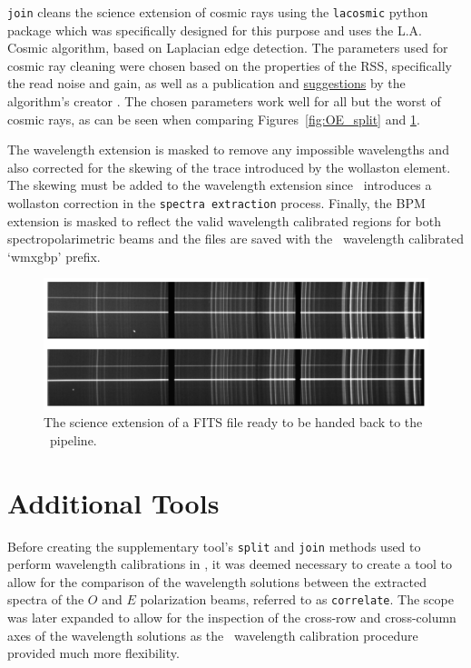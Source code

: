 \texttt{join} cleans the science extension of cosmic rays using the \texttt{lacosmic} python package which was specifically designed for this purpose and uses the L.A. Cosmic algorithm, based on Laplacian edge detection. The parameters used for cosmic ray cleaning were chosen based on the properties of the \gls{RSS}, specifically the read noise and gain, as well as a publication and \hyperlink{http://www.astro.yale.edu/dokkum/lacosmic/pars.html}{suggestions} by the algorithm's creator \citep{lacosmic}. The chosen parameters work well for all but the worst of cosmic rays, as can be seen when comparing Figures~\ref{fig:OE_split} and \ref{fig:polsalt_post_wav_cal}.
\prgph

The wavelength extension is masked to remove any impossible wavelengths and also corrected for the skewing of the trace introduced by the wollaston element. The skewing must be added to the wavelength extension since \polsalt\ introduces a wollaston correction in the \texttt{spectra extraction} process. Finally, the \gls{BPM} extension is masked to reflect the valid wavelength calibrated regions for both spectropolarimetric beams and the files are saved with the \polsalt\ wavelength calibrated `wmxgbp' prefix.

\begin{figure}[t]
    \centering
    \includegraphics[width = 1.0\textwidth]{figures/3_post_wav_cal.pdf}
    \caption{The science extension of a \gls{FITS} file ready to be handed back to the \polsalt\ pipeline.}
    \label{fig:polsalt_post_wav_cal}
\end{figure}


\section{Additional Tools}\label{sec:add_tools}

Before creating the supplementary tool's \texttt{split} and \texttt{join} methods used to perform wavelength calibrations in \iraf, it was deemed necessary to create a tool to allow for the comparison of the wavelength solutions between the extracted spectra of the $O$ and $E$ polarization beams, referred to as \texttt{correlate}. The scope was later expanded to allow for the inspection of the cross-row and cross-column axes of the wavelength solutions as the \iraf\ wavelength calibration procedure provided much more flexibility.


